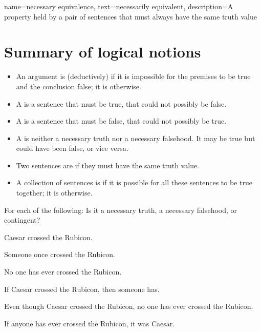 {
name={necessary equivalence},
text={necessarily equivalent},
description={A property held by a pair of sentences that must always have the same truth value}
}

\section*{Summary of logical notions}

\begin{itemize}
\item An argument is (deductively)  if it is impossible for the premises to be true and the conclusion false; it is  otherwise.

\item A  is a sentence that must be true, that could not possibly be false.

\item A  is a sentence that must be false, that could not possibly be true.

\item A  is neither a necessary truth nor a necessary falsehood. It may be true but could have been false, or vice versa.

\item Two sentences are  if they must have the same truth value.

\item A collection of sentences is  if it is possible for all these sentences to be true together; it is  otherwise.
\end{itemize}


\practiceproblems
\problempart
\label{pr.EnglishTautology2}
For each of the following: Is it a necessary truth, a necessary falsehood, or contingent?
\begin{earg}
\item Caesar crossed the Rubicon.
\item Someone once crossed the Rubicon.
\item No one has ever crossed the Rubicon.
\item If Caesar crossed the Rubicon, then someone has.
\item Even though Caesar crossed the Rubicon, no one has ever crossed the Rubicon.
\item If anyone has ever crossed the Rubicon, it was Caesar.
\end{earg}

